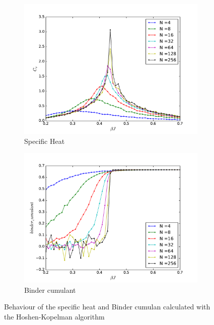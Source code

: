 \documentclass[twoside]{article}
\begin{document}
\begin{multicols}{2}
\begin{figure}[!tpb] 
 \begin{subfigure}[b]{0.35\textwidth}
    \includegraphics[width=\textwidth]{images/cv.pdf}
    \caption{Specific Heat}
    \label{cv}
  \end{subfigure}
  \begin{subfigure}[b]{0.35\textwidth}
    \includegraphics[width=\textwidth]{images/binder_cumulant.pdf}
    \caption{Binder cumulant}
    \label{bc}
  \end{subfigure}
  \caption{Behaviour of the specific heat and Binder cumulan calculated with the Hoshen-Kopelman algorithm}
\end{figure}


\end{multicols}
\end{document}
